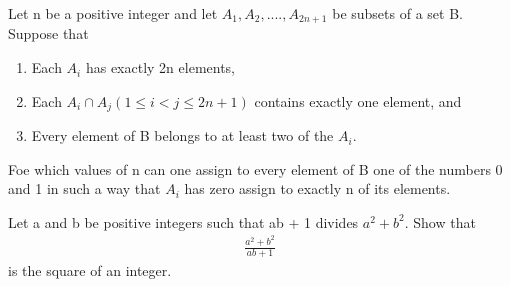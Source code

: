 \item Let n be a positive integer and let $A_1, A_2,....,A_{2n+1}$ be subsets of a set B. Suppose that
\begin{enumerate}
\item Each $A_i$ has exactly 2n elements,
\item  Each $A_i \cap A_j (1 \leq i < j \leq 2n + 1)$ contains exactly one element, and
\item Every element of B belongs to at least two of the $A_i$.
\end{enumerate}
Foe which values of n can one assign to every element of B one of the numbers 0 and 1 in such a way that $A_i$  has zero assign to exactly n of its elements.

\item Let a and b be positive integers such that ab + 1 divides $a^2 + b^2$. Show that
\begin{align*}
\frac{a^{2} + b^{2}}{ab + 1}
\end{align*}
is the square of an integer.


















